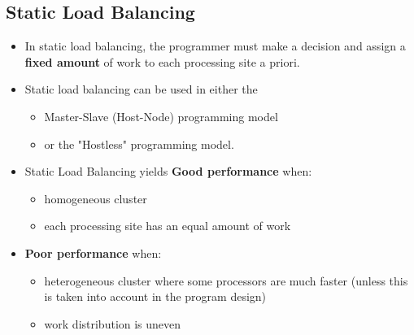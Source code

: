 \documentclass[12pt, a4paper]{book}
\begin{document}
\subsection{Static Load Balancing}
\begin{itemize}
    \item In static load balancing, the programmer must make a decision and assign a \textbf{fixed amount} of work to each processing site a priori.
    \item Static load balancing can be used in either the
          \begin{itemize}
              \item  Master-Slave (Host-Node) programming model
              \item or the "Hostless" programming model.
          \end{itemize}
    \item Static Load Balancing yields \textbf{Good performance} when:
          \begin{itemize}
              \item homogeneous cluster
              \item each processing site has an equal amount of work
          \end{itemize}
    \item \textbf{Poor performance} when:
          \begin{itemize}
              \item heterogeneous cluster where some processors are much faster (unless this is taken into account in the program design)
              \item work distribution is uneven
          \end{itemize}
\end{itemize}
\end{document}
